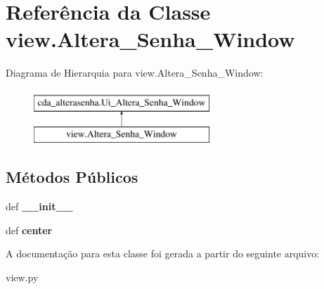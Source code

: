 \hypertarget{classview_1_1Altera__Senha__Window}{\section{\-Referência da \-Classe view.\-Altera\-\_\-\-Senha\-\_\-\-Window}
\label{classview_1_1Altera__Senha__Window}
}
\-Diagrama de \-Hierarquia para view.\-Altera\-\_\-\-Senha\-\_\-\-Window\-:\begin{figure}[H]
\begin{center}
\leavevmode
\includegraphics[height=2.000000cm]{classview_1_1Altera__Senha__Window}
\end{center}
\end{figure}
\subsection*{\-Métodos \-Públicos}
\begin{DoxyCompactItemize}
\item 
\hypertarget{classview_1_1Altera__Senha__Window_a06ae4ec888055e1ede0f28c47c4f039a}{def {\bfseries \-\_\-\-\_\-init\-\_\-\-\_\-}}\label{classview_1_1Altera__Senha__Window_a06ae4ec888055e1ede0f28c47c4f039a}

\item 
\hypertarget{classview_1_1Altera__Senha__Window_ac059ce61da6758ad6d855d972cd895ca}{def {\bfseries center}}\label{classview_1_1Altera__Senha__Window_ac059ce61da6758ad6d855d972cd895ca}

\end{DoxyCompactItemize}


\-A documentação para esta classe foi gerada a partir do seguinte arquivo\-:\begin{DoxyCompactItemize}
\item 
view.\-py\end{DoxyCompactItemize}
